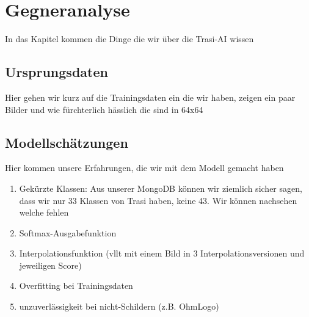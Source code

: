 \chapter{Gegneranalyse}
In das Kapitel kommen die Dinge die wir über die Trasi-AI wissen
\section{Ursprungsdaten}
Hier gehen wir kurz auf die Trainingsdaten ein die wir haben, zeigen ein paar Bilder und wie fürchterlich hässlich die sind in 64x64

\section{Modellschätzungen}
Hier kommen unsere Erfahrungen, die wir mit dem Modell gemacht haben

\begin{enumerate}
	\item Gekürzte Klassen: Aus unserer MongoDB können wir ziemlich sicher sagen, dass wir nur 33 Klassen von Trasi haben, keine 43. Wir können nachsehen welche fehlen
	\item Softmax-Ausgabefunktion
	\item Interpolationsfunktion (vllt mit einem Bild in 3 Interpolationsversionen und jeweiligen Score) 
	\item Overfitting bei Trainingsdaten
	\item unzuverlässigkeit bei nicht-Schildern (z.B. OhmLogo)
\end{enumerate}

